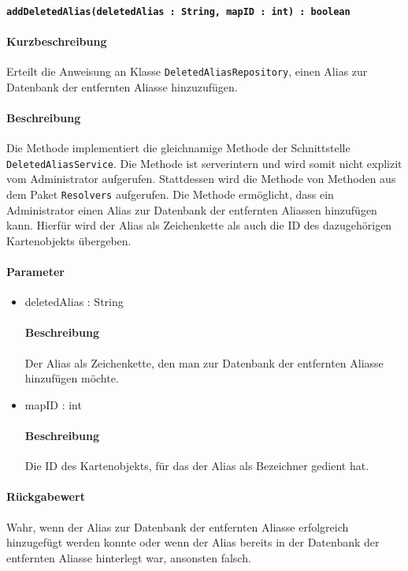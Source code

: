 \paragraph*{\texttt{addDeletedAlias(deletedAlias : String, mapID : int) : boolean}}%
\paragraph*{Kurzbeschreibung}
Erteilt die Anweisung an Klasse \texttt{DeletedAliasRepository}, einen Alias zur Datenbank der entfernten Aliasse hinzuzufügen.
\paragraph*{Beschreibung}
Die Methode implementiert die gleichnamige Methode der Schnittstelle \texttt{DeletedAliasService}.
Die Methode ist serverintern und wird somit nicht explizit vom Administrator aufgerufen.
Stattdessen wird die Methode von Methoden aus dem Paket \texttt{Resolvers} aufgerufen.
Die Methode ermöglicht, dass ein Administrator einen Alias zur Datenbank der entfernten Aliassen hinzufügen kann.
Hierfür wird der Alias als Zeichenkette als auch die ID des dazugehörigen Kartenobjekts übergeben.
\paragraph*{Parameter}
\begin{itemize}
    \item deletedAlias : String
    		\paragraph*{Beschreibung}
    		Der Alias als Zeichenkette, den man zur Datenbank der entfernten Aliasse hinzufügen möchte.
    \item mapID : int
    		\paragraph*{Beschreibung}
    		Die ID des Kartenobjekts, für das der Alias als Bezeichner gedient hat.
\end{itemize}
\paragraph*{Rückgabewert}
Wahr, wenn der Alias zur Datenbank der entfernten Aliasse erfolgreich hinzugefügt werden konnte oder wenn der Alias bereits in der Datenbank der entfernten Aliasse hinterlegt war, ansonsten falsch.
